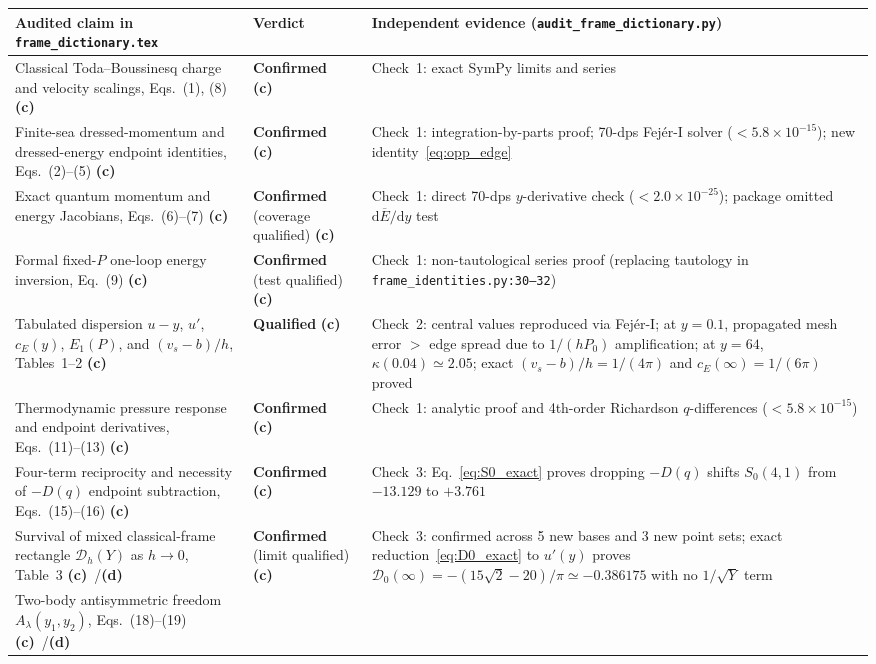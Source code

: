 \documentclass[11pt,a4paper]{article}
\newcommand{\Lc}{\textsf{\textbf{(c)}}\ }
\newcommand{\Ld}{\textsf{\textbf{(d)}}\ }
\newcommand{\scr}{\texttt{audit\_\allowbreak frame\_\allowbreak dictionary.py}}
\newcommand{\dd}{\mathrm d}
\begin{document}
\begin{table}[ht]\centering\small
\begin{tabular}{@{}L{5.6cm}L{2.5cm}L{6.2cm}@{}}\toprule
Audited claim in \texttt{frame\_dictionary.tex} & Verdict & Independent evidence (\scr)\\\midrule
Classical Toda--Boussinesq charge and velocity scalings, Eqs.~(1), (8) \Lc
 & \textbf{Confirmed} \Lc & Check~1: exact SymPy limits and series\\
Finite-sea dressed-momentum and dressed-energy endpoint identities, Eqs.~(2)--(5) \Lc
 & \textbf{Confirmed} \Lc & Check~1: integration-by-parts proof; 70-dps Fej\'er-I solver ($<5.8\times 10^{-15}$); new identity~\eqref{eq:opp_edge}\\
Exact quantum momentum and energy Jacobians, Eqs.~(6)--(7) \Lc
 & \textbf{Confirmed} (coverage qualified) \Lc & Check~1: direct 70-dps $y$-derivative check ($<2.0\times 10^{-25}$); package omitted $\dd\overline E/\dd y$ test\\
Formal fixed-$P$ one-loop energy inversion, Eq.~(9) \Lc
 & \textbf{Confirmed} (test qualified) \Lc & Check~1: non-tautological series proof (replacing tautology in \texttt{frame\_identities.py:30--32})\\
Tabulated dispersion $u-y$, $u'$, $c_E(y)$, $E_1(P)$, and $(v_s-b)/h$, Tables~1--2 \Lc
 & \textbf{Qualified} \Lc & Check~2: central values reproduced via Fej\'er-I; at $y=0.1$, propagated mesh error $> $ edge spread due to $1/(hP_0)$ amplification; at $y=64$, $\kappa(0.04)\simeq 2.05$; exact $(v_s-b)/h=1/(4\pi)$ and $c_E(\infty)=1/(6\pi)$ proved\\
Thermodynamic pressure response and endpoint derivatives, Eqs.~(11)--(13) \Lc
 & \textbf{Confirmed} \Lc & Check~1: analytic proof and 4th-order Richardson $q$-differences ($<5.8\times 10^{-15}$)\\
Four-term reciprocity and necessity of $-D(q)$ endpoint subtraction, Eqs.~(15)--(16) \Lc
 & \textbf{Confirmed} \Lc & Check~3: Eq.~\eqref{eq:S0_exact} proves dropping $-D(q)$ shifts $S_0(4,1)$ from $-13.129$ to $+3.761$\\
Survival of mixed classical-frame rectangle $\mathcal D_h(Y)$ as $h\to 0$, Table~3 \Lc/\Ld
 & \textbf{Confirmed} (limit qualified) \Lc & Check~3: confirmed across 5 new bases and 3 new point sets; exact reduction~\eqref{eq:D0_exact} to $u'(y)$ proves $\mathcal D_0(\infty)=-(15\sqrt2-20)/\pi\simeq -0.386175$ with no $1/\sqrt Y$ term\\
Two-body antisymmetric freedom $A_\lambda(y_1,y_2)$, Eqs.~(18)--(19) \Lc/\Ld

\end{tabular}
\end{table}
\end{document}
